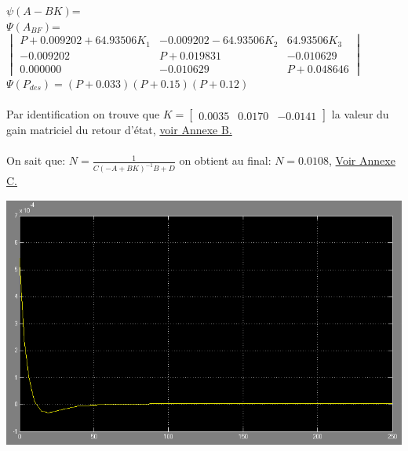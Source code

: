 		\begin{center}
					
			$\psi(A-BK)$=\\$\Psi(A_{BF})$=$\begin{vmatrix}
			P+0.009202+64.93506K_1&-0.009202-64.93506K_2&64.93506K_3\\
			-0.009202&P+0.019831&-0.010629\\
			 0.000000&-0.010629&P+0.048646
			\end{vmatrix}$\\[1.5cm]
			
			$\Psi(P_{des})=(P+0.033)(P+0.15)(P+0.12)$			
			
		\end{center}
		
		\paragraph{} Par identification on trouve que $K=\begin{bmatrix} 0.0035&0.0170&-0.0141\end{bmatrix}$ la valeur du gain matriciel du retour d'état,\label{K} \hyperref[Annexe B]{voir Annexe B.}\\
		
		\paragraph{} On sait que: $N=\frac{1}{C(-A+BK)^{-1}B+D}$ on obtient au final: $N=0.0108$,\label{N} \hyperref[Annexe C]{Voir Annexe C.}
		
		\begin{center}
		\includegraphics[scale=0.5]{q1(t).PNG} 
		\label{fig2}
		\end{center}

